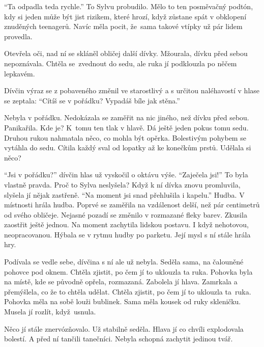 \documentclass{article}
\begin{document}
	\enquote{Ta odpadla teda rychle.}
	To Sylvu probudilo.
	Mělo to ten posměvačný podtón, kdy si jeden může být jist rizikem,
	které hrozí, když zůstane spát v obklopení znuděných teenagerů.
	Navíc měla pocit, že~sama takové vtípky už pár lidem provedla.\par
	Otevřela oči, nad ní se skláněl obličej další dívky.
	Mžourala, dívku před sebou nepoznávala.
	Chtěla se~zvednout do sedu, ale ruka jí podklouzla po něčem lepkavém.\par
	Dívčin výraz se z pobaveného změnil ve starostlivý
	a s určitou naléhavostí v hlase se zeptala:
	\enquote{Cítíš se v pořádku? Vypadáš bíle jak stěna.}\par
	Nebyla v pořádku.
	Nedokázala se zaměřit na nic jiného, než dívku před sebou.
	Panikařila.
	Kde je?
	K~tomu ten tlak v hlavě.
	Dá ještě jeden pokus tomu sedu.
	Druhou rukou nahmatala něco, co mohla být opěrka.
	Bolestivým pohybem se vytáhla do sedu.
	Cítila každý sval od lopatky až ke konečkům prstů.
	Udělala si něco?\par
	\enquote{Jsi v pořádku?} dívčin hlas už vyskočil o oktávu výše.
	\enquote{Zaječela jsi!}
	To byla vlastně pravda.
	Proč to Sylva neslyšela? %
	Když k ní dívka znovu promluvila, slyšela jí nějak zastřeně.
	\enquote{Na moment jsi snad přehlušila i kapelu.}
	Hudba.
	V místnosti hrála hudba.
	Poprvé se zaměřila na vzdálenost delší,
	než pár centimetrů od svého obličeje.
	Nejasné pozadí se změnilo v rozmazané fleky barev.
	Zkusila zaostřit ještě jednou.
	Na moment zachytila lidskou postavu.
	I když nehotovou, neopracovanou.
	Hýbala se v rytmu hudby po parketu.
	Její mysl s ní stále hrála hry.\par
	Podívala se vedle sebe, dívčina s ní ale už nebyla.
	Seděla sama, na čalouněné pohovce pod oknem.
	Chtěla zjistit, po čem jí to uklouzla ta ruka.
	Pohovka byla na místě, kde se původně opřela, rozmazaná.
	Zabolela jí hlava.
	Zamrkala a přemýšlela, co že to chtěla udělat.
	Chtěla zjistit, po čem jí to uklouzla ta~ruka.
	Pohovka měla na sobě louži bublinek.
	Sama měla kousek od ruky skleničku.
	Musela jí rozlít, když~usnula.\par
	Něco jí stále znervózňovalo.
	Už stabilně seděla.
	Hlava jí co chvíli explodovala bolestí.
	A před ní tančili tanečníci.
	Nebyla schopná zachytit jedinou tvář.
	
	
\end{document}
